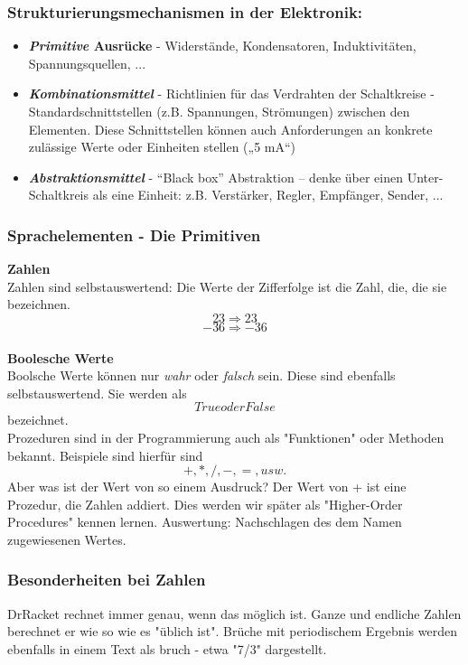 \subsubsection{Strukturierungsmechanismen in der Elektronik:}
\begin{itemize}
	\item \textbf{\textit{Primitive} Ausrücke}
		\subitem - Widerstände, Kondensatoren, Induktivitäten, Spannungsquellen, ...

	\item \textbf{\textit{Kombinationsmittel}}
		\subitem - Richtlinien für das Verdrahten der Schaltkreise
		\subitem - Standardschnittstellen (z.B. Spannungen, Strömungen) zwischen den
		Elementen. Diese Schnittstellen können auch Anforderungen an
		konkrete zulässige Werte oder Einheiten stellen („5 mA“)
		
	\item \textbf{\textit{Abstraktionsmittel}}
		\subitem - 	“Black box” Abstraktion – denke über einen Unter-Schaltkreis als eine
		Einheit: z.B. Verstärker, Regler, Empfänger, Sender, ...
\end{itemize}

\subsubsection{Sprachelementen - Die Primitiven}
\textbf{Zahlen} \\
Zahlen sind selbstauswertend: Die Werte der Zifferfolge ist die Zahl,
die, die sie bezeichnen. 
$$ 23 \Rightarrow 23 $$
$$ -36 \Rightarrow -36 $$ 
\\

\textbf{Boolesche Werte} \\
Boolsche Werte können nur \textit{wahr} oder \textit{falsch} sein. Diese sind ebenfalls
selbstauswertend. Sie werden als $$True oder False$$ bezeichnet.\\


Prozeduren sind in der Programmierung auch als "Funktionen" oder Methoden bekannt. Beispiele sind hierfür sind
$$ +, *, /, -, =, usw.$$
Aber was ist der Wert von so einem Ausdruck? Der Wert von + ist eine Prozedur, die Zahlen addiert.
Dies werden wir später als "Higher-Order Procedures" kennen lernen.
Auswertung: Nachschlagen des dem Namen zugewiesenen Wertes.

\subsubsection{Besonderheiten bei Zahlen}
DrRacket rechnet immer genau, wenn das möglich ist. Ganze und endliche Zahlen berechnet er wie so wie es 
"üblich ist".
Brüche mit periodischem Ergebnis werden ebenfalls in einem Text als bruch - etwa "7/3" dargestellt.
